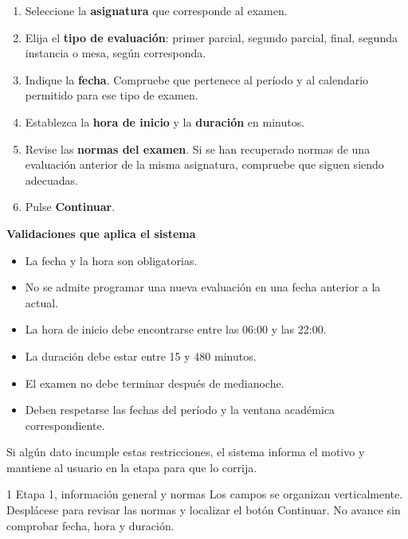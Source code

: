 \begin{enumerate}
    \item Seleccione la \textbf{asignatura}
    que corresponde al examen.

    \item Elija el \textbf{tipo de evaluación}:
    primer parcial, segundo parcial, final,
    segunda instancia o mesa, según corresponda.

    \item Indique la \textbf{fecha}.
    Compruebe que pertenece al período y al
    calendario permitido para ese tipo de examen.

    \item Establezca la \textbf{hora de inicio}
    y la \textbf{duración} en minutos.

    \item Revise las \textbf{normas del examen}.
    Si se han recuperado normas de una evaluación
    anterior de la misma asignatura, compruebe que
    siguen siendo adecuadas.

    \item Pulse \textbf{Continuar}.
\end{enumerate}

\noindent\textbf{Validaciones que aplica el sistema}

\begin{itemize}
    \item La fecha y la hora son obligatorias.
    \item No se admite programar una nueva evaluación
    en una fecha anterior a la actual.
    \item La hora de inicio debe encontrarse
    entre las 06:00 y las 22:00.
    \item La duración debe estar entre
    15 y 480 minutos.
    \item El examen no debe terminar después
    de medianoche.
    \item Deben respetarse las fechas del período
    y la ventana académica correspondiente.
\end{itemize}

Si algún dato incumple estas restricciones,
el sistema informa el motivo y mantiene al usuario
en la etapa para que lo corrija.

\CapturasRegistro
{1}
{Etapa 1, información general y normas}
{Los campos se organizan verticalmente.
Desplácese para revisar las normas y localizar
el botón Continuar. No avance sin comprobar
fecha, hora y duración.}


